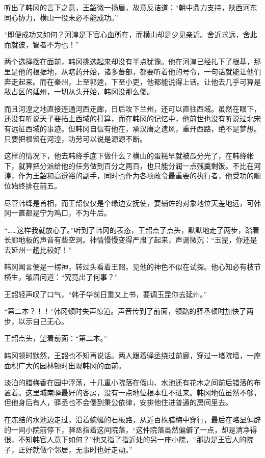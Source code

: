 听出了韩冈的言下之意，王韶微一扬眉，故意反诘道：“朝中鼎力支持，陕西河东同心协力，横山一役未必不能成功。”

“即便成功又如何？河湟是下官心血所在，而横山却是少见亲近。舍近求远，舍此而就彼，智者不为也！”

两个选择摆在面前，韩冈挑选起来却没有半点犹豫。他在河湟已经扎下了根基，那里是他的根据地，从瞎药开始，诸多蕃部，都要听着他的号令，一句话就能让他们奔走起来。而在秦州，上至郭逵，下至小吏，他都能说得上话。让他去几乎可算是敌占区的延州，一切从头开始，韩冈没那么傻。

而且河湟之地直接连通河西走廊，日后攻下兰州，还可以直往西域。虽然在眼下，还没有听说天子要拓土西域的打算，而在韩冈的记忆中，他前世也没有听说过北宋有远征西域的事迹。但韩冈自信有他在，承汉唐之遗风，重开西路，绝不是梦想。只要把根留在河湟，功劳可以说是源源不断。

这样的情况下，他去韩绛手底下做什么？横山的蛋糕早就被瓜分光了，在韩绛帐下，就算把分派给他的任务做到百分之两百，也只能分润一点残羹剩饭。不比在河湟，作为王韶和高遵裕的副手，同时也作为各项政令最重要的执行者，他受功的顺位始终排在前五。

尽管韩绛是首相，而王韶仅仅是个缘边安抚使，要辅佐的对象地位天差地远，可韩冈一直都是宁为鸡口，不为牛后。

“……这样我就放心了。”听到了韩冈的表态，王韶点了点头，默默地走了两步，踏着长廊地板的声音有些空洞。神情慢慢变得严肃了起来，声调微沉：“玉昆，你还是去延州一趟比较好！”

韩冈闻言便是一楞神，转过头看着王韶，见他的神色不似在试探。他心知必有枝节横生，皱眉问道：“究竟出了何事？”

王韶轻声叹了口气，“韩子华前日重又上书，要调玉昆你去延州。”

“第二本？！！”韩冈顿时失声惊道。声音传到了前面，领路的驿丞顿时加快了两步，以示自己无心。

王韶点头，望着前面：“第二本。”

韩冈顿时默然，王韶也不知再说话。两人跟着驿丞绕过前廊，穿过一堵院墙，一座面积广大的园林顿时出现韩冈的面前。

淡泊的腊梅香在园中浮荡，十几重小院落在假山、水池还有花木之间前后错落的布置着。这里城南驿最好的客房，没有一点地位根本住不进来。韩冈地位虽然不够，但他身后有人，驿丞也不会傻到秉公依律，安排他住进普通的房间里去。

在冻结的水池边走过，沿着蜿蜒的石板路，从近百株腊梅中穿行，最后在略显偏辟的一间小院前停下，驿丞指着这间院落，“这件院落虽然偏僻了一点，却是清净得很，不知韩官人意下如何？”他又指了指近处的另一座小院，“那边是王官人的院子，正好就做个邻居，无事时也好走动。”

